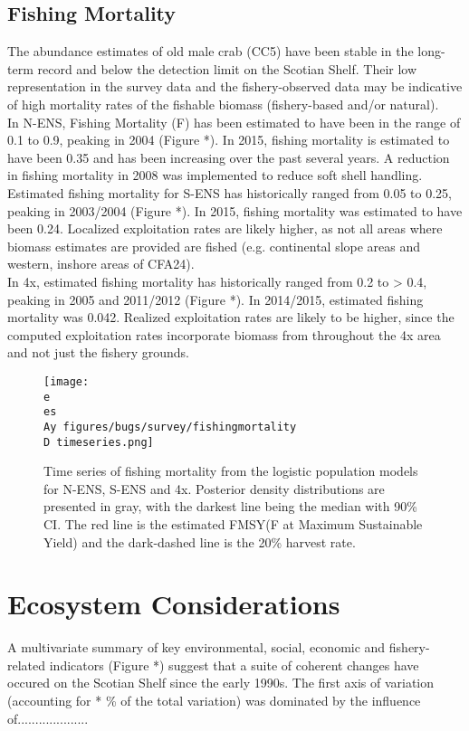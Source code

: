 \documentclass[paper=a4, fontsize=11pt]{article}
\newcommand{\D}{.}
\newcommand{\e}{/home/michelle/ecomod_data/}
\newcommand{\es}{snowcrab/}
\newcommand{\Ay}{assessments/2015/}
\begin{document}
\subsection{Fishing Mortality}
The abundance estimates of old male crab (CC5) have been stable in the long-term record and below the detection limit on the Scotian Shelf. Their low representation in the survey data and the fishery-observed data may be indicative of high mortality rates of the fishable biomass (fishery-based and/or natural). \\

In N-ENS, Fishing Mortality (F) has been estimated to have been in the range of 0.1 to 0.9, peaking in 2004 (Figure *). In 2015, fishing mortality is estimated to have been 0.35 and has been increasing over the past several years. A reduction in fishing mortality in 2008 was implemented to reduce soft shell handling.\\

Estimated fishing mortality for S-ENS has historically ranged from 0.05 to 0.25, peaking in 2003/2004 (Figure *). In 2015, fishing mortality was estimated to have been 0.24. Localized exploitation rates are likely higher, as not all areas where biomass estimates are provided are fished (e.g. continental slope areas and western, inshore areas of CFA24).\\

In 4x, estimated fishing mortality has historically ranged from 0.2 to > 0.4, peaking in 2005 and 
2011/2012 (Figure *). In 2014/2015, estimated fishing mortality was 0.042. Realized exploitation rates are likely to be higher, since the computed exploitation rates incorporate biomass from throughout the 4x area and not just the fishery grounds.

\begin{figure}[ht]
    \centering
    \texttt{[image: \\e \\es \\Ay figures/bugs/survey/fishingmortality\\D timeseries.png]}
    \caption{Time series of fishing mortality from the logistic population models for N-ENS, S-ENS and 4x. Posterior density distributions are presented in gray, with the darkest line being the median with 90\% CI. The red line is the estimated FMSY(F at Maximum Sustainable Yield) and the dark-dashed line is the 20\% harvest rate.}
\end{figure}
\clearpage

\section{Ecosystem Considerations}
A multivariate summary of key environmental, social, economic and fishery-related indicators (Figure *) suggest that a suite of coherent changes have occured on the Scotian Shelf since the early 1990s. The first axis of variation (accounting for * \% of the total variation) was dominated by the influence of....................
\end{document}
